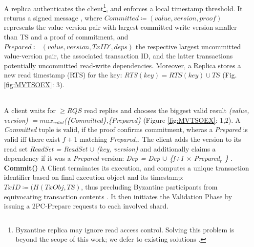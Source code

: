 \\
A replica authenticates the client\footnote{Byzantine replica may ignore read access control. Solving this problem is beyond the scope of this work; we defer to existing solutions \cite{basu2019efficient}.}, and enforces a local timestamp threshold.  It returns a signed message , where $Committed \coloneqq (value, version, proof)$ represents the value-version pair with largest committed write version smaller than TS and a proof of commitment,  and $Prepared \coloneqq (value, version, TxID', deps)$ the respective largest uncommitted value-version pair, the associated transaction ID, and the latter transactions potentially uncommitted read-write dependencies. Moreover, a Replica stores a new read timestamp (RTS) for the key: $RTS(key) = RTS(key) \cup TS$ (Fig. \ref{fig:MVTSOEX}: 3). 

\\
A client waits for $\geq RQS$ read replies and chooses the biggest valid result \textit{(value, version) $= max_{valid}$(\{Committed\},\{Prepared\}} (Figure \ref{fig:MVTSOEX}: 1,2). A \textit{Committed} tuple is valid, if the proof confirms commitment, wheras a \textit{Prepared} is valid iff there exist $f+1$ matching \textit{Prepared$_r$}. The client adds the version to its read set \textit{ReadSet = ReadSet $\cup$ (key, version)} and additionally claims a dependency if it was a \textit{Prepared} version: \textit{Dep = Dep $\cup$ \{f+1 $\times$ Prepared$_r$ \}} . 
\textbf{Commit()} A Client terminates its execution, and computes a unique transaction identifier based on final execution object and its timestamp: $TxID \coloneqq (H(TxObj, TS)$,  thus precluding Byzantine participants from equivocating transaction contents . It then initiates the Validation Phase by issuing a 2PC-Prepare requests to each involved shard.

